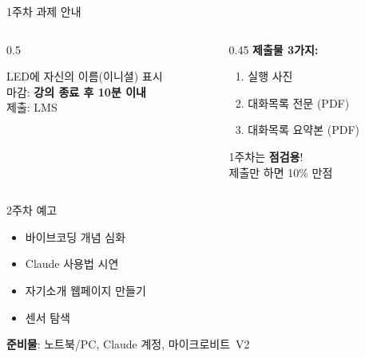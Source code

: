 \documentclass[aspectratio=169]{beamer}
\begin{document}
\begin{frame}{ 1주차 과제 안내}
\begin{columns}
  \begin{column}{0.5\textwidth}
    \begin{tcolorbox}[keybox, title=과제 내용]
       LED에 자신의 이름(이니셜) 표시\\[0.2cm]
       마감: \textbf{강의 종료 후 10분 이내}\\
       제출: LMS
    \end{tcolorbox}
  \end{column}
  \begin{column}{0.45\textwidth}
    \textbf{제출물 3가지:}
    \begin{enumerate}
      \item 실행 사진
      \item 대화목록 전문 (PDF)
      \item 대화목록 요약본 (PDF)
    \end{enumerate}
    \vspace{0.3cm}
    \begin{tcolorbox}[warnbox]
       1주차는 \textbf{점검용}!\\
      제출만 하면 10\% 만점 
    \end{tcolorbox}
  \end{column}
\end{columns}
\end{frame}

\begin{frame}{ 2주차 예고}
\begin{tcolorbox}[keybox, title=\emoji{books} 다음 주에는...]
  \begin{itemize}
    \item {} 바이브코딩 개념 심화
    \item {} Claude 사용법 시연
    \item {} 자기소개 웹페이지 만들기
    \item {} 센서 탐색
  \end{itemize}
\end{tcolorbox}
\vspace{0.3cm}
\begin{tcolorbox}[tipbox]
   \textbf{준비물}: 노트북/PC, Claude 계정, 마이크로비트~V2
\end{tcolorbox}
\end{frame}
\end{document}
